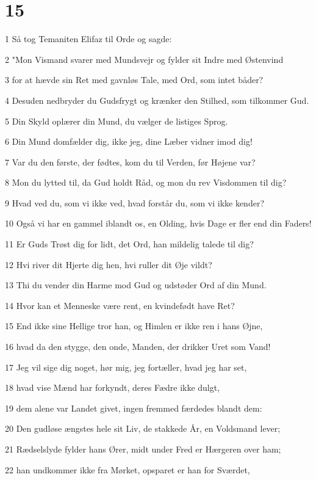 \chapter{15}

\par 1 Så tog Temaniten Elifaz til Orde og sagde:
\par 2 "Mon Vismand svarer med Mundsvejr og fylder sit Indre med Østenvind
\par 3 for at hævde sin Ret med gavnløs Tale, med Ord, som intet båder?
\par 4 Desuden nedbryder du Gudsfrygt og krænker den Stilhed, som tilkommer Gud.
\par 5 Din Skyld oplærer din Mund, du vælger de listiges Sprog.
\par 6 Din Mund domfælder dig, ikke jeg, dine Læber vidner imod dig!
\par 7 Var du den første, der fødtes, kom du til Verden, før Højene var?
\par 8 Mon du lytted til, da Gud holdt Råd, og mon du rev Visdommen til dig?
\par 9 Hvad ved du, som vi ikke ved, hvad forstår du, som vi ikke kender?
\par 10 Også vi har en gammel iblandt os, en Olding, hvis Dage er fler end din Faders!
\par 11 Er Guds Trøst dig for lidt, det Ord, han mildelig talede til dig?
\par 12 Hvi river dit Hjerte dig hen, hvi ruller dit Øje vildt?
\par 13 Thi du vender din Harme mod Gud og udstøder Ord af din Mund.
\par 14 Hvor kan et Menneske være rent, en kvindefødt have Ret?
\par 15 End ikke sine Hellige tror han, og Himlen er ikke ren i hans Øjne,
\par 16 hvad da den stygge, den onde, Manden, der drikker Uret som Vand!
\par 17 Jeg vil sige dig noget, hør mig, jeg fortæller, hvad jeg har set,
\par 18 hvad vise Mænd har forkyndt, deres Fædre ikke dulgt,
\par 19 dem alene var Landet givet, ingen fremmed færdedes blandt dem:
\par 20 Den gudløse ængstes hele sit Liv, de stakkede År, en Voldsmand lever;
\par 21 Rædselslyde fylder hans Ører, midt under Fred er Hærgeren over ham;
\par 22 han undkommer ikke fra Mørket, opsparet er han for Sværdet,
